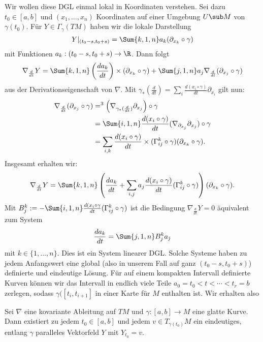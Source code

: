 Wir wollen diese DGL einmal lokal in Koordinaten verstehen. Sei dazu $t_0 \in [a,b]$ und $(x_1, \dots, x_n)$ Koordinaten auf einer Umgebung $U \sub M$ von $\gamma (t_0)$. Für $Y \in \Gamma_\gamma (TM)$ haben wir die lokale Darstellung 
\begin{equation}
Y|_{(t_0-s, t_0+s)} = \Sum{k,1,n} a_k (\partial_{x_k} \circ \gamma)
\end{equation}
mit Funktionen $a_k: (t_0-s, t_0+s) \to \R$. Dann folgt
\begin{equation}
\nabla_\frac{d}{dt} Y = \Sum{k,1,n} \left( \frac{da_k}{dt}\right) \times (\partial_{x_k} \circ \gamma) + \Sum{j,1,n} a_j \nabla_\frac{d}{dt} (\partial_{x_j} \circ \gamma)
\end{equation}
aus der Derivationseigenschaft von $\nabla$. Mit $\gamma_\ast (\frac{d}{dt}) = \sum_i \frac{d (x_i \circ \gamma)}{dt} \partial_{x_i}$ gilt nun: 
\begin{align}
\nabla_\frac{d}{dt} (\partial_{x_j} \circ \gamma) &=^3 \left( \nabla_{\gamma_\ast (\frac{d}{dt} )} \partial_{x_j}\right) \circ \gamma\\
&= \Sum{i,1,n} \frac{d (x_i \circ \gamma)}{dt} (\nabla_{\partial_{x_j}} \partial_{x_j} ) \circ \gamma \\
&= \sum_{i,k} \frac{d (x_i \circ \gamma)}{dt} \times (\Gamma_{ij}^k \circ \gamma)(\partial_{x_k} \circ \gamma).
\end{align}
Insgesamt erhalten wir:
\begin{equation}
\nabla_\frac{d}{dt}Y = \Sum{k,1,n} \left( \frac{d a_k}{dt} + \sum_{i,j} a_j \frac{d (x_i \circ \gamma)}{dt} (\Gamma_{ij}^k \circ \gamma)\right)(\partial_{x_k} \circ \gamma).
\end{equation}
Mit $B_j^k := - \Sum{i,1,n} \frac{d (x_i \circ \gamma}{dt} (\Gamma_{ij}^k \circ \gamma)$ ist die Bedingung $\nabla_\frac{d}{dt}  Y = 0$ äquivalent zum System
\begin{equation}
\frac{d a_k}{dt} = \Sum{j,1,n} B_j^k a_j
\end{equation}
mit $k \in \{1, \dots, n \}$. Dies ist ein System linearer DGL. Solche Systeme haben zu jedem Anfangswert eine global (also in unserem Fall auf ganz $(t_0 -s, t_0 +s)$) definierte und eindeutige Lösung. Für auf einem kompakten Intervall definierte Kurven können wir das Intervall in endlich viele Teile $a_0 = t_0 < t < \cdots < t_r =b$ zerlegen, sodass $\gamma([t_i, t_{i+1}]$ in einer Karte für $M$ enthalten ist. Wir erhalten also
\begin{satz}{}{}
Sei $\nabla$ eine kovariante Ableitung auf $TM$ und $\gamma: [a,b] \to M$ eine glatte Kurve. Dann existiert zu jedem $t_0 \in [a,b]$ und jedem $v \in T_{\gamma (t_0)} M$ ein eindeutiges, entlang $\gamma$ paralleles Vektorfeld $Y$ mit $Y_{t_0} = v$.
\end{satz}
